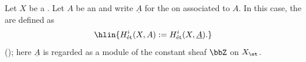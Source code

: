 \begin{definition} \label{definition:etale_cohomology_group_of_a_scheme_with_coefficients_in_an_abelian_group}
Let $X$ be a . Let $A$ be an  and write $\underline{A}$ for the  on  associated to $A$. In this case, the  are defined as 
$$\hlin{H^i_{\mathrm{\acute{e}t}}(X, A) := H^i_{\mathrm{\acute{e}t}}(X, \underline{A}).}$$
(); here $\underline{A}$ is regarded as a module of the constant sheaf $\bbZ$ on $X_{\et}$. 
\end{definition}